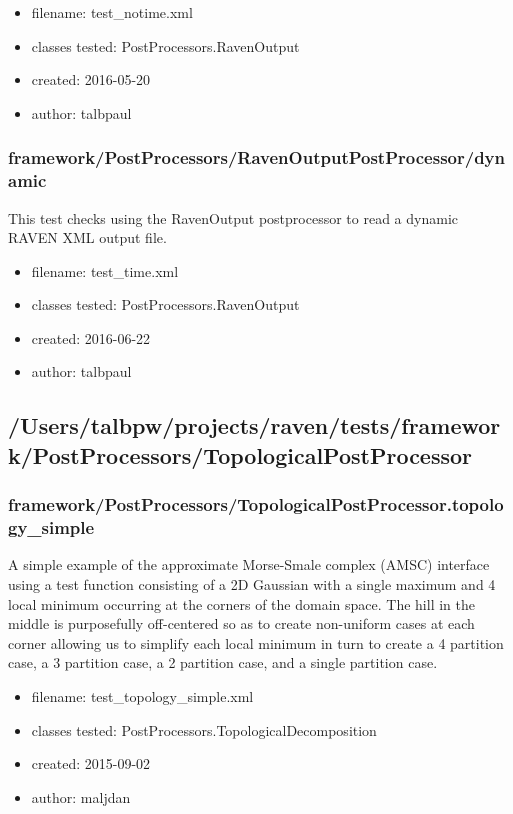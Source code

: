       \begin{itemize}
          \item filename: test\_notime.xml
          \item classes tested: PostProcessors.RavenOutput
          \item created: 2016-05-20
          \item author: talbpaul
      \end{itemize}
    \subsubsection{framework/PostProcessors/RavenOutputPostProcessor/dynamic}
      
      This test checks using the RavenOutput postprocessor to read a dynamic RAVEN XML output file.
    
      \begin{itemize}
          \item filename: test\_time.xml
          \item classes tested: PostProcessors.RavenOutput
          \item created: 2016-06-22
          \item author: talbpaul
      \end{itemize}
  \subsection{/Users/talbpw/projects/raven/tests/framework/PostProcessors/TopologicalPostProcessor}
    \subsubsection{framework/PostProcessors/TopologicalPostProcessor.topology\_simple}
      
       A simple example of the approximate Morse-Smale complex (AMSC) interface
       using a test function consisting of a 2D Gaussian with a single maximum
       and 4 local minimum occurring at the corners of the domain space. The
       hill in the middle is purposefully off-centered so as to create
       non-uniform cases at each corner allowing us to simplify each local
       minimum in turn to create a 4 partition case, a 3 partition case, a 2
       partition case, and a single partition case.
    
      \begin{itemize}
          \item filename: test\_topology\_simple.xml
          \item classes tested: PostProcessors.TopologicalDecomposition
          \item created: 2015-09-02
          \item author: maljdan
      \end{itemize}
